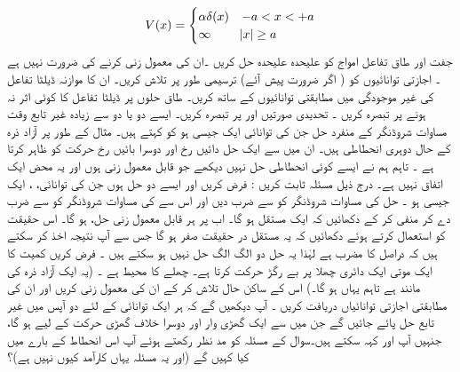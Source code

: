 \begin{align*}
V(x)=
\begin{cases}
\alpha\delta (x)& -a< x< +a\\
\infty &\abs{x}\ge a
\end{cases}
 \end{align*} 
 جفت اور طاق تفاعل امواج کو علیحدہ علیحدہ حل کریں ۔ان کی معمول زنی کرنے   کی ضرورت نہیں ہے ۔ اجازتی توانائیوں کو ( اگر ضرورت پیش آئے) ترسیمی طور پر تلاش کریں۔ ان کا موازنہ ڈیلٹا تفاعل کی غیر موجودگی میں مطابقتی توانائیوں کے ساتھ کریں۔ طاق حلوں پر ڈیلٹا تفاعل کا کوئی اثر نہ ہونے پر تبصرہ کریں ۔ تحدیدی صورتیں  اور پر تبصرہ کریں۔ 
 ایسے دو یا دو سے زیادہ غیر تابع وقت مساوات شروڈنگر کے منفرد حل جن کی توانائی  ایک  جیسی ہو کو  کہتے ہیں۔ مثال کے طور پر آزاد ذرہ کے حال دوہری انحطاطی ہیں۔ ان میں سے ایک حل دائیں رخ اور دوسرا بائیں رخ حرکت کو ظاہر کرتا ہے ۔ تاہم ہم نے ایسے کوئی انحطاطی حل نہیں دیکھے جو قابل  معمول زنی  ہوں  اور یہ محض ایک اتفاق نہیں ہے۔ 
 درج ذیل مسئلہ ثابت کریں : 
 فرض کریں
 اور  ایسے دو حل ہوں جن کی توانائی، ، ایک  جیسی ہو ۔ حل  کی مساوات شروڈنگر کو  سے ضرب دیں اور اس سے کی مساوات شروڈنگر کو  سے ضرب دے کر منفی کر کے دکھائیں کہ  ایک مستقل ہو گا۔
 اب  پر   ہر قابل معمول زنی  حل،   ہو گا۔ اس حقیقت کو استعمال کرتے ہوئے دکھائیں کہ یہ مستقل در حقیقت صفر ہو گا جس سے آپ نتیجہ اخذ کر سکتے ہیں کہ  دراصل  کا مضرب ہے لہٰذا یہ حل دو الگ الگ حل نہیں ہو سکتے ہیں ۔
فرض کریں کمیت  کا ایک موتی ایک دائری چھلا پر بے رگڑ حرکت کرتا ہے۔ چھلے کا محیط  ہے ۔ (یہ ایک آزاد ذرہ کی مانند ہے تاہم یہاں ہو گا۔) اس کے ساکن حال تلاش کر کے ان کی  معمول زنی کریں  اور ان کی مطابقتی اجازتی توانائیاں دریافت کریں ۔ آپ دیکھیں گے کہ ہر ایک توانائی کے لئے دو آپس میں غیر تابع حل پائے جائیں گے جن میں سے ایک گھڑی وار اور دوسرا خلاف گھڑی حرکت کے لیے ہو گا، جنہیں آپ اور  کہہ سکتے ہیں۔سوال  کے مسئلہ کو مد نظر رکھتے ہوئے آپ اس انحطاط کے بارے میں کیا کہیں گے (اور یہ مسئلہ یہاں کارآمد کیوں نہیں ہے)؟ 

